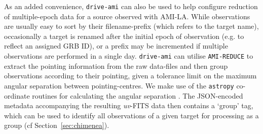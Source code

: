 \documentclass[5p,authoryear]{elsarticle}
\begin{document}
As an added convenience, \texttt{drive-ami} can also be used to help configure reduction of multiple-epoch data for a source observed with AMI-LA. 
While observations are usually easy to sort by their filename-prefix (which refers to the target name), occasionally a target is renamed after the initial epoch of observation (e.g. to reflect an assigned GRB ID), or a prefix may be incremented if multiple observations are performed in a single day. 
\texttt{drive-ami} can utilise \texttt{AMI-REDUCE} to extract the pointing information from the raw data-files and then group observations according to their pointing, given a tolerance limit on the maximum angular separation between pointing-centres. 
We make use of the \texttt{astropy} co-ordinate routines for calculating the angular separation \citep{Astropy2013}.
The JSON-encoded metadata accompanying the resulting \textit{uv}-FITS data then contains a `group' tag, which can be used to identify all observations of a given target for processing as a group (cf Section~\ref{sec:chimenea}).
\end{document}
